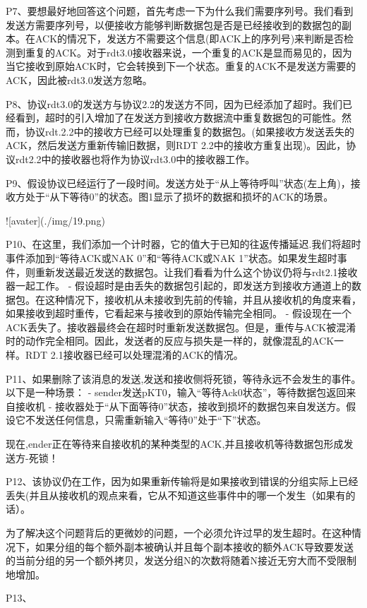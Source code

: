\documentclass[11pt,UTF8,twoside]{article}
\begin{document}
	P7、要想最好地回答这个问题，首先考虑一下为什么我们需要序列号。我们看到发送方需要序列号，以便接收方能够判断数据包是否是已经接收到的数据包的副本。在ACK的情况下，发送方不需要这个信息(即ACK上的序列号)来判断是否检测到重复的ACK。对于rdt3.0接收器来说，一个重复的ACK是显而易见的，因为当它接收到原始ACK时，它会转换到下一个状态。重复的ACK不是发送方需要的ACK，因此被rdt3.0发送方忽略。
	
	P8、协议rdt3.0的发送方与协议2.2的发送方不同，因为已经添加了超时。我们已经看到，超时的引入增加了在发送方到接收方数据流中重复数据包的可能性。然而，协议rdt.2.2中的接收方已经可以处理重复的数据包。(如果接收方发送丢失的ACK，然后发送方重新传输旧数据，则RDT 2.2中的接收方重复出现)。因此，协议rdt2.2中的接收器也将作为协议rdt3.0中的接收器工作。
	
	P9、假设协议已经运行了一段时间。发送方处于“从上等待呼叫”状态(左上角)，接收方处于“从下等待0”的状态。图1显示了损坏的数据和损坏的ACK的场景。
	
	![avater](./img/19.png)
	
	P10、在这里，我们添加一个计时器，它的值大于已知的往返传播延迟.我们将超时事件添加到“等待ACK或NAK 0”和“等待ACK或NAK 1”状态。如果发生超时事件，则重新发送最近发送的数据包。让我们看看为什么这个协议仍将与rdt2.1接收器一起工作。
	- 假设超时是由丢失的数据包引起的，即发送方到接收方通道上的数据包。在这种情况下，接收机从未接收到先前的传输，并且从接收机的角度来看，如果接收到超时重传，它看起来与接收到的原始传输完全相同。
	- 假设现在一个ACK丢失了。接收器最终会在超时时重新发送数据包。但是，重传与ACK被混淆时的动作完全相同。因此，发送者的反应与损失是一样的，就像混乱的ACK一样。RDT 2.1接收器已经可以处理混淆的ACK的情况。
	
	P11、如果删除了该消息的发送,发送和接收侧将死锁，等待永远不会发生的事件。以下是一种场景：
	- sender发送pKT0，输入“等待Ack0状态”，等待数据包返回来自接收机
	- 接收器处于“从下面等待0”状态，接收到损坏的数据包来自发送方。假设它不发送任何信息，只需重新输入“等待0”处于“下”状态。
	
	现在,ender正在等待来自接收机的某种类型的ACK,并且接收机等待数据包形成发送方-死锁！
	
	P12、该协议仍在工作，因为如果重新传输将是如果接收到错误的分组实际上已经丢失(并且从接收机的观点来看，它从不知道这些事件中的哪一个发生（如果有的话）。
	
	为了解决这个问题背后的更微妙的问题，一个必须允许过早的发生超时。在这种情况下，如果分组的每个额外副本被确认并且每个副本接收的额外ACK导致要发送的当前分组的另一个额外拷贝，发送分组N的次数将随着N接近无穷大而不受限制地增加。
	
	P13、
	
\end{document}
